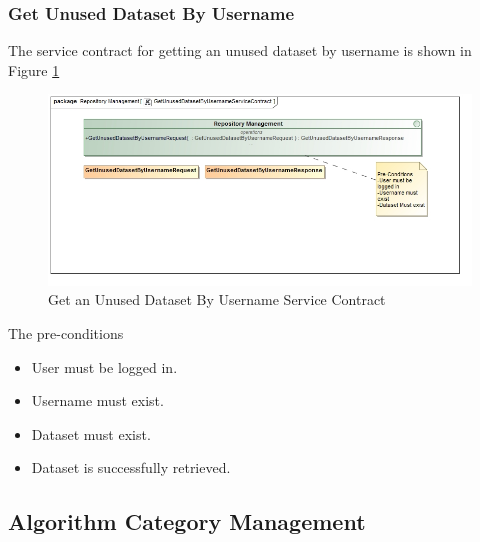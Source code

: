 \subsubsection{Get Unused Dataset By Username}
The service contract for getting an unused dataset by username is shown in Figure \ref{fig:getUnusedDatasetByUsername}
\begin{figure}[H]
  \begin{center}
    \includegraphics[scale=0.6]{../Diagrams and Charts/Test Data/GetUnusedDatasetByUsernameServiceContract.jpg}
    \caption{Get an Unused Dataset By Username Service Contract}
    \label{fig:getUnusedDatasetByUsername}
  \end{center}
  
\end{figure}  

The pre-conditions
\begin{itemize}
  \item User must be logged in.
  \item Username must exist.
  \item Dataset must exist.
	\item Dataset is successfully retrieved.
\end{itemize}

\subsection{Algorithm Category Management}


